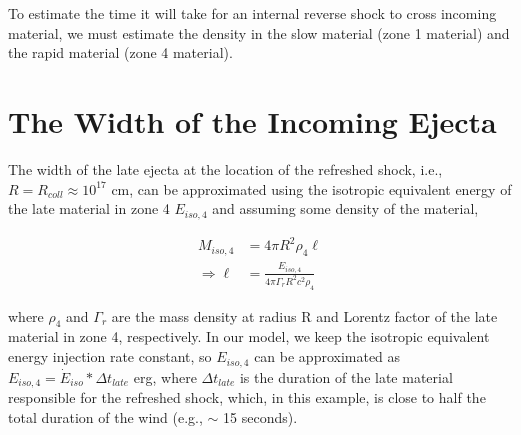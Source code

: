 \documentclass[linenumbers,twocolumn]{aastex631}
\begin{document}
{    To estimate the time it will take for an internal reverse shock to cross incoming material, we must estimate the density in the slow material (zone 1 material) and the rapid material (zone 4 material). 
}






\section{The Width of the Incoming Ejecta}
{
    The width of the late ejecta at the location of the refreshed shock, i.e., $R = R_{coll} \approx 10^{17}$ cm, can be approximated using the isotropic equivalent energy of the late material in zone 4 $E_{iso,4}$  and assuming some density of the material,

    \begin{align}
        M_{iso,4} &= 4 \pi R^2 \rho_{4} \ell\\
        \Rightarrow \ell &= \frac{E_{iso,4}}{4\pi\Gamma_r R^2 c^2 \rho_{4}}
    \end{align}

    where $\rho_{4}$ and $\Gamma_r$ are the mass density at radius R and Lorentz factor of the late material in zone 4, respectively. In our model, we keep the isotropic equivalent energy injection rate constant, so $E_{iso,4}$ can be approximated as $E_{iso,4} = \dot{E}_{iso} * \Delta t_{late}$ erg, where $\Delta t_{late}$ is the duration of the late material responsible for the refreshed shock, which, in this example, is close to half the total duration of the wind (e.g., $\sim$ 15 seconds).
}
\end{document}
